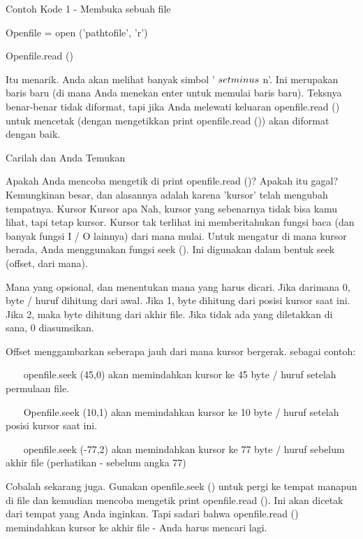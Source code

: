 Contoh Kode 1 - Membuka sebuah file \par
\vspace{12pt}
Openfile = open ('pathtofile', 'r') \par
Openfile.read () \par
\vspace{12pt}
Itu menarik. Anda akan melihat banyak simbol ' $  \\setminus  $ n'. Ini merupakan baris baru (di mana Anda menekan enter untuk memulai baris baru). Teksnya benar-benar tidak diformat, tapi jika Anda melewati keluaran openfile.read () untuk mencetak (dengan mengetikkan print openfile.read ()) akan diformat dengan baik. \par
Carilah dan Anda Temukan \par
\vspace{12pt}
Apakah Anda mencoba mengetik di print openfile.read ()? Apakah itu gagal? Kemungkinan besar, dan alasannya adalah karena 'kursor' telah mengubah tempatnya. Kursor Kursor apa Nah, kursor yang sebenarnya tidak bisa kamu lihat, tapi tetap kursor. Kursor tak terlihat ini memberitahukan fungsi baca (dan banyak fungsi I / O lainnya) dari mana mulai. Untuk mengatur di mana kursor berada, Anda menggunakan fungsi seek (). Ini digunakan dalam bentuk seek (offset, dari mana). \par
\vspace{12pt}
Mana yang opsional, dan menentukan mana yang harus dicari. Jika darimana 0, byte / huruf dihitung dari awal. Jika 1, byte dihitung dari posisi kursor saat ini. Jika 2, maka byte dihitung dari akhir file. Jika tidak ada yang diletakkan di sana, 0 diasumsikan. \par
\vspace{12pt}
Offset menggambarkan seberapa jauh dari mana kursor bergerak. sebagai contoh: \par
\vspace{12pt}
~~~ openfile.seek (45,0) akan memindahkan kursor ke 45 byte / huruf setelah permulaan file. \par
~~~ Openfile.seek (10,1) akan memindahkan kursor ke 10 byte / huruf setelah posisi kursor saat ini. \par
~~~ openfile.seek (-77,2) akan memindahkan kursor ke 77 byte / huruf sebelum akhir file (perhatikan - sebelum angka 77) \par
\vspace{12pt}
Cobalah sekarang juga. Gunakan openfile.seek () untuk pergi ke tempat manapun di file dan kemudian mencoba mengetik print openfile.read (). Ini akan dicetak dari tempat yang Anda inginkan. Tapi sadari bahwa openfile.read () memindahkan kursor ke akhir file - Anda harus mencari lagi. \par
